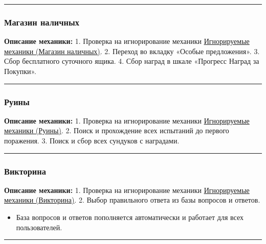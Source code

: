\documentclass[
]{article}
\providecommand{\tightlist}{%
  \setlength{\itemsep}{0pt}\setlength{\parskip}{0pt}}
\begin{document}
\begin{center}\rule{0.5\linewidth}{0.5pt}\end{center}

\subsubsection{Магазин
наличных}\label{ux43cux430ux433ux430ux437ux438ux43d-ux43dux430ux43bux438ux447ux43dux44bux445}

\textbf{Описание механики:} 1. Проверка на игнорирование механики
\hyperref[ignor_states]{Игнорируемые механики (Магазин наличных)}. 2.
Переход во вкладку «Особые предложения». 3. Сбор бесплатного суточного
ящика. 4. Сбор наград в шкале «Прогресс Наград за Покупки».

\begin{center}\rule{0.5\linewidth}{0.5pt}\end{center}

\subsubsection{Руины}\label{ux440ux443ux438ux43dux44b}

\textbf{Описание механики:} 1. Проверка на игнорирование механики
\hyperref[ignor_states]{Игнорируемые механики (Руины)}. 2. Поиск и
прохождение всех испытаний до первого поражения. 3. Поиск и сбор всех
сундуков с наградами.

\begin{center}\rule{0.5\linewidth}{0.5pt}\end{center}

\subsubsection{Викторина}\label{ux432ux438ux43aux442ux43eux440ux438ux43dux430}

\textbf{Описание механики:} 1. Проверка на игнорирование механики
\hyperref[ignor_states]{Игнорируемые механики (Викторина)}. 2. Выбор
правильного ответа из базы вопросов и ответов.

\begin{itemize}
\tightlist
\item
  База вопросов и ответов пополняется автоматически и работает для всех
  пользователей.
\end{itemize}

\begin{center}\rule{0.5\linewidth}{0.5pt}\end{center}
\end{document}
